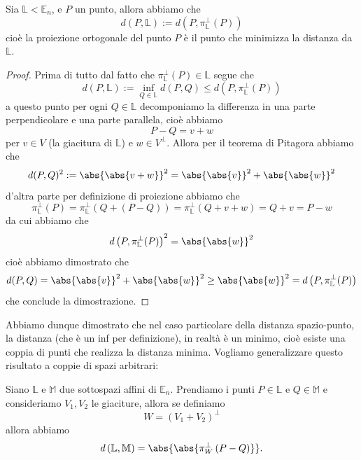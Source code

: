 \documentclass[11pt]{scrartcl}
\newcommand{\LL}{\mathbb{L}}
\begin{document}
   	 \begin{lemma}
   	 	Sia $\LL< \mathbb{E}_n$, e $P$ un punto, allora abbiamo che 
   	 	$$d(P,\mathbb{L}):=d\left(P,\pi_\mathbb{L}^\perp (P)\right)$$
   	 	cioè la proiezione ortogonale del punto $P$ è il punto che minimizza la distanza da $\LL$.
   	 \end{lemma}
   	 \begin{proof}
   	 	Prima di tutto dal fatto che $\pi_\LL^\perp(P)\in \LL$ segue che 
   	 	$$d(P,\LL):=\inf_{Q\in\LL}d(P,Q)\le d\left(P,\pi_\LL^\perp(P)\right)$$
   	 	a questo punto per ogni $Q\in \LL$ decomponiamo la differenza in una parte perpendicolare e una parte parallela, cioè abbiamo 
   	 	$$P-Q=v+w$$
   	 	per $v\in V$ (la giacitura di $\LL$) e $w\in V^\perp$. Allora per il teorema di Pitagora abbiamo che 
   	 	$$d(P,Q)^2:=\abs{\abs{v+w}}^2=\abs{\abs{v}}^2+\abs{\abs{w}}^2$$
   	 	d'altra parte per definizione di proiezione abbiamo che 
   	 	$$\pi_\LL^\perp(P)=\pi_\LL^\perp(Q+(P-Q))=\pi_\LL^\perp(Q+v+w)=Q+v=P-w$$
   	 	da cui abbiamo che 
   	 	$$d\left(P,\pi_\LL^\perp(P)\right)^2=\abs{\abs{w}}^2$$
   	 	cioè abbiamo dimostrato che
   	 	$$d(P,Q)=\abs{\abs{v}}^2+\abs{\abs{w}}^2\ge \abs{\abs{w}}^2=d\left(P,\pi_\LL^\perp(P)\right) $$
   	 	che conclude la dimostrazione.
   	 \end{proof}
   	 Abbiamo dunque dimostrato che nel caso particolare della distanza spazio-punto, la distanza (che è un inf per definizione), in realtà è un minimo, cioè esiste una coppia di punti che realizza la distanza minima. Vogliamo generalizzare questo risultato a coppie di spazi arbitrari:
   	 \begin{lemma}
   	 	Siano $\LL$ e $\mathbb{M}$ due sottospazi affini di $\mathbb{E}_n$. Prendiamo i punti $P\in \LL$ e $Q\in\mathbb{M}$ e consideriamo $V_1,V_2$ le giaciture, allora se definiamo
   	 	$$W=\left(V_1+V_2\right)^\perp$$ 
   	 	allora abbiamo
   	 	$$d\left(\LL,\mathbb{M}\right)=\abs{\abs{\pi_W^\perp\left(P-Q\right)}}.$$
   	 \end{lemma}
\end{document}
